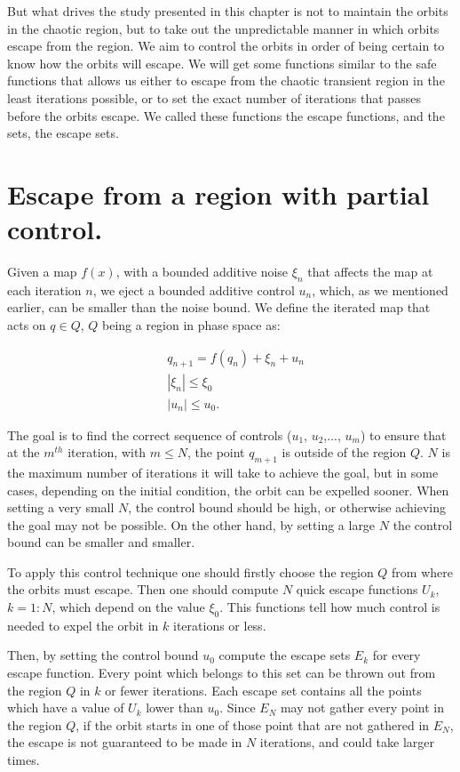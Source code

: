But what drives the study presented in this chapter is not to maintain the orbits in the chaotic region, but to take out the unpredictable manner in which orbits escape from the region. We aim to control the orbits in order of being certain to know how the orbits will escape. We will get some functions similar to the safe functions that allows us either to escape from the chaotic transient region in the least iterations possible, or to set the exact number of iterations that passes before the orbits escape. We called these functions the escape functions, and the sets, the escape sets.
 
\section{Escape from a region with partial control.}

Given a map $f(x)$, with a bounded additive noise $\xi_n$ that affects the map at each iteration $n$, we eject a bounded additive control $u_n$, which, as we mentioned earlier, can be smaller than the noise bound. We define the iterated map that acts on $q\in Q$, $Q$ being a region in phase space as:

\begin{equation}
\begin{split}
&q_{n+1}=f(q_n)+\xi_n+u_n \\
&|\xi_n|\leq \xi_0 \\
&|u_n|\leq u_0.
\end{split}
\end{equation}

The goal is to find the correct sequence of controls ($u_1$, $u_2$,..., $u_m$) to ensure that at the $m^{th}$ iteration, with $m \leq N$, the point $q_{m+1}$ is outside of the region $Q$. $N$ is the maximum number of iterations it will take to achieve the goal, but in some cases, depending on the initial condition, the orbit can be expelled sooner. When setting a very small $N$, the control bound should be high, or otherwise achieving the goal may not be possible. On the other hand, by setting a large $N$ the control bound can be smaller and smaller.

To apply this control technique one should firstly choose the region $Q$ from where the orbits must escape. Then one should compute $N$ quick escape functions $U_k$, $k = 1:N$, which depend on the value $\xi_0$. This functions tell how much control is needed to expel the orbit in $k$ iterations or less.

Then, by setting the control bound $u_0$ compute the escape sets $E_k$ for every escape function. Every point which belongs to this set can be thrown out from the region $Q$ in $k$ or fewer iterations. Each escape set contains all the points which have a value of $U_k$ lower than $u_0$. Since $E_N$ may not gather every point in the region $Q$, if the orbit starts in one of those point that are not gathered in $E_N$, the escape is not guaranteed to be made in $N$ iterations, and could take larger times.

